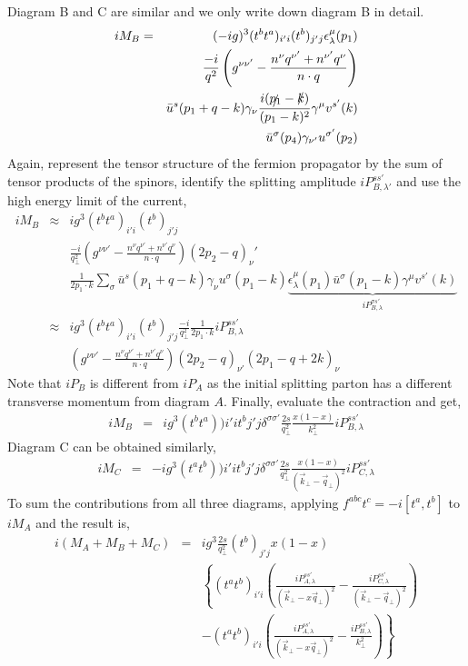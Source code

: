 Diagram B and C are similar and we only write down diagram B in detail.
\begin{eqnarray}
i M_B &=& (-ig)^3 (t^bt^a)_{i'i}(t^b)_{j'j} \epsilon_\lambda^\mu(p_1) \\\nonumber
&&\frac{-i}{q^2}\left(g^{\nu\nu'}-\frac{n^{\nu}q^{\nu'}+n^{\nu'}q^\nu}{n\cdot q}\right) \\\nonumber
&&\bar{u}^s(p_1+q-k)\gamma_{\nu}\frac{i(\slashed{p_1}-\slashed{k})}{(p_1-k)^2}\gamma^{\mu}v^{s'}(k) \\ \nonumber
&&\bar{u}^{\sigma}(p_4)\gamma_{\nu'}u^{\sigma'}(p_2)
\end{eqnarray}
Again, represent the tensor structure of the fermion propagator by the sum of tensor products of the spinors, identify the splitting amplitude $iP_{B,\lambda'}^{ss'}$ and use the high energy limit of the current,
\begin{eqnarray}
i M_B &\approx& ig^3 (t^bt^a)_{i'i}(t^b)_{j'j}  \\\nonumber
&&\frac{-i}{q_\perp^2}\left(g^{\nu\nu'}-\frac{n^{\nu}q^{\nu'}+n^{\nu'}q^\nu}{n\cdot q}\right) (2p_2-q)_\nu' \\\nonumber
&&\frac{1}{2p_1\cdot k} \sum_\sigma \bar{u}^s(p_1+q-k)\gamma_{\nu} u^{\sigma}(p_1-k) \underbrace{\epsilon_\lambda^\mu(p_1)\bar{u}^{\sigma}(p_1-k) \gamma^{\mu}v^{s'}(k)}_{iP_{B,\lambda}^{\sigma s'}}\\
&\approx& ig^3 (t^bt^a)_{i'i}(t^b)_{j'j} \frac{-i}{q_\perp^2}\frac{1}{2p_1\cdot k} iP_{B,\lambda}^{ss'}\\\nonumber
&&\left(g^{\nu\nu'}-\frac{n^{\nu}q^{\nu'}+n^{\nu'}q^\nu}{n\cdot q}\right) (2p_2-q)_{\nu'} (2p_1-q+2k)_\nu 
\end{eqnarray}
Note that $iP_{B}$ is different from $iP_{A}$ as the initial splitting parton has a different transverse momentum from diagram $A$.
Finally, evaluate the contraction and get,
\begin{eqnarray}
i M_B &=& i g^3 (t^b t^a)){i'i} t^b{j'j} \delta^{\sigma\sigma'} \frac{2s}{q_\perp^2} \frac{x(1-x)}{k_\perp^2}  iP_{B,\lambda}^{ss'}
\end{eqnarray}
Diagram C can be obtained similarly,
\begin{eqnarray}
i M_C &=& -i g^3 (t^a t^b)){i'i} t^b{j'j} \delta^{\sigma\sigma'} \frac{2s}{q_\perp^2} \frac{x(1-x)}{(\vec{k}_\perp-\vec{q}_\perp)^2}  iP_{C,\lambda}^{ss'} 
\end{eqnarray}
To sum the contributions from all three diagrams, applying $f^{abc}t^c = -i[t^a, t^b]$ to $iM_A$ and the result is,
\begin{eqnarray}
i (M_A+M_B+M_C) &=& ig^3 \frac{2s}{q_\perp^2} (t^b)_{j'j} x(1-x)\\\nonumber
&&\left\{(t^a t^b)_{i'i} \left(\frac{iP_{A,\lambda}^{ss'} }{(\vec{k}_\perp-x \vec{q}_\perp)^2} - \frac{iP_{C,\lambda}^{ss'}}{(\vec{k}_\perp-\vec{q}_\perp)^2}\right) \right. \\\nonumber
&&\left.-(t^a t^b)_{i'i}\left(\frac{iP_{A,\lambda}^{ss'} }{(\vec{k}_\perp-x \vec{q}_\perp)^2} - \frac{iP_{B,\lambda}^{ss'}}{k_\perp^2}\right) \right\}
\end{eqnarray}

